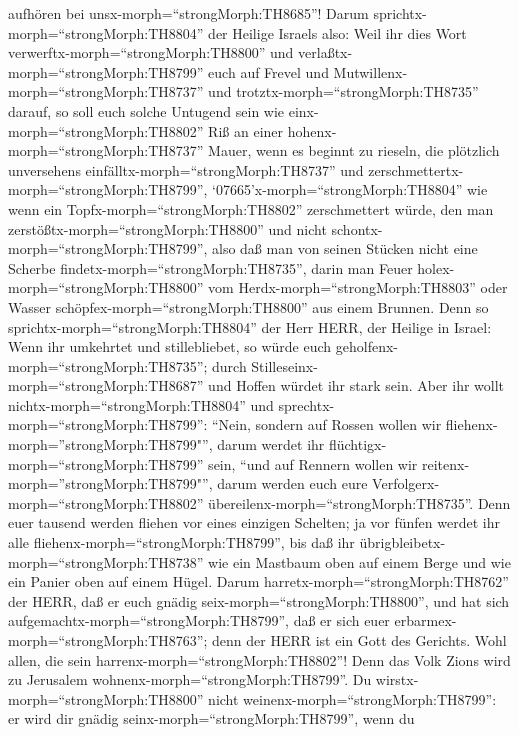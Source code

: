aufhören bei unsx-morph=``strongMorph:TH8685''!  Darum
sprichtx-morph=``strongMorph:TH8804'' der Heilige Israels also: Weil ihr
dies Wort verwerftx-morph=``strongMorph:TH8800'' und
verlaßtx-morph=``strongMorph:TH8799'' euch auf Frevel und
Mutwillenx-morph=``strongMorph:TH8737'' und
trotztx-morph=``strongMorph:TH8735'' darauf,  so soll euch
solche Untugend sein wie einx-morph=``strongMorph:TH8802'' Riß an einer
hohenx-morph=``strongMorph:TH8737'' Mauer, wenn es beginnt zu rieseln,
die plötzlich unversehens einfälltx-morph=``strongMorph:TH8737'' und
zerschmettertx-morph=``strongMorph:TH8799'', 
`07665'\textbar x-morph=``strongMorph:TH8804'' wie wenn ein
Topfx-morph=``strongMorph:TH8802'' zerschmettert würde, den man
zerstößtx-morph=``strongMorph:TH8800'' und nicht
schontx-morph=``strongMorph:TH8799'', also daß man von seinen Stücken
nicht eine Scherbe findetx-morph=``strongMorph:TH8735'', darin man Feuer
holex-morph=``strongMorph:TH8800'' vom
Herdx-morph=``strongMorph:TH8803'' oder Wasser
schöpfex-morph=``strongMorph:TH8800'' aus einem Brunnen. 
Denn so sprichtx-morph=``strongMorph:TH8804'' der Herr HERR, der Heilige
in Israel: Wenn ihr umkehrtet und stillebliebet, so würde euch
geholfenx-morph=``strongMorph:TH8735''; durch
Stilleseinx-morph=``strongMorph:TH8687'' und Hoffen würdet ihr stark
sein. Aber ihr wollt nichtx-morph=``strongMorph:TH8804'' 
und sprechtx-morph=``strongMorph:TH8799'': ``Nein, sondern auf Rossen
wollen wir fliehenx-morph=''strongMorph:TH8799"'', darum werdet ihr
flüchtigx-morph=``strongMorph:TH8799'' sein, ``und auf Rennern wollen
wir reitenx-morph=''strongMorph:TH8799"'', darum werden euch eure
Verfolgerx-morph=``strongMorph:TH8802''
übereilenx-morph=``strongMorph:TH8735''.  Denn euer tausend
werden fliehen vor eines einzigen Schelten; ja vor fünfen werdet ihr
alle fliehenx-morph=``strongMorph:TH8799'', bis daß ihr
übrigbleibetx-morph=``strongMorph:TH8738'' wie ein Mastbaum oben auf
einem Berge und wie ein Panier oben auf einem Hügel.  Darum
harretx-morph=``strongMorph:TH8762'' der HERR, daß er euch gnädig
seix-morph=``strongMorph:TH8800'', und hat sich
aufgemachtx-morph=``strongMorph:TH8799'', daß er sich euer
erbarmex-morph=``strongMorph:TH8763''; denn der HERR ist ein Gott des
Gerichts. Wohl allen, die sein harrenx-morph=``strongMorph:TH8802''!
 Denn das Volk Zions wird zu Jerusalem
wohnenx-morph=``strongMorph:TH8799''. Du
wirstx-morph=``strongMorph:TH8800'' nicht
weinenx-morph=``strongMorph:TH8799'': er wird dir gnädig
seinx-morph=``strongMorph:TH8799'', wenn du
